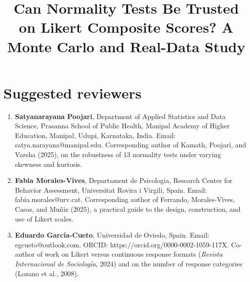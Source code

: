 \documentclass[jou,floatsintext]{apa7}
\title{Can Normality Tests Be Trusted on Likert Composite Scores? A Monte Carlo and Real-Data Study}
\begin{document}
\maketitle

\clearpage
\section*{Suggested reviewers}

\begin{enumerate}
\item \textbf{Satyanarayana Poojari}, Department of Applied Statistics and Data Science, Prasanna School of Public Health, Manipal Academy of Higher Education, Manipal, Udupi, Karnataka, India. Email: satya.narayana@manipal.edu. Corresponding author of Kamath, Poojari, and Varsha (2025), on the robustness of 13 normality tests under varying skewness and kurtosis.
\item \textbf{Fabia Morales-Vives}, Departament de Psicologia, Research Center for Behavior Assessment, Universitat Rovira i Virgili, Spain. Email: fabia.morales@urv.cat. Corresponding author of Ferrando, Morales-Vives, Casas, and Mu\~niz (2025), a practical guide to the design, construction, and use of Likert scales.
\item \textbf{Eduardo Garc\'ia-Cueto}, Universidad de Oviedo, Spain. Email: egcueto@outlook.com. ORCID: https://orcid.org/0000-0002-1059-117X. Co-author of work on Likert versus continuous response formats (\emph{Revista Internacional de Sociolog\'ia}, 2024) and on the number of response categories (Lozano et al., 2008).
\end{enumerate}
\end{document}
